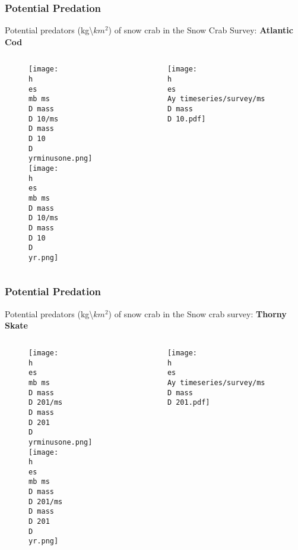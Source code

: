\documentclass{beamer}
\numberwithin{equation}{section}		%
\numberwithin{figure}{section}	   	%
\numberwithin{table}{section}				%
\newcommand{\yr}{2017}
\newcommand{\yrminusone}{2016}
\newcommand{\D}{.}  %
\newcommand{\h}{C:/} %
\newcommand{\es}{bio.data/bio.snowcrab/} %
\newcommand{\Ay}{assessments/2017/}
\newcommand{\mb}{output/maps/survey/snowcrab/annual/bycatch/} %
\begin{document}
\begin{frame}
\frametitle{Potential Predation}
Potential predators (kg\textbackslash$km^2$) of snow crab in the Snow Crab Survey: \textbf{Atlantic Cod}
	\begin{columns}

	\begin{column}{0.4\textwidth}
 	\begin{figure}
    \texttt{[image: \\h \\es \\mb ms\\D mass\\D 10/ms\\D mass\\D 10\\D \\yrminusone.png]}\\   
    \texttt{[image: \\h \\es \\mb ms\\D mass\\D 10/ms\\D mass\\D 10\\D \\yr.png]}\\   
    \end{figure}
  	\end{column}

	\begin{column}{0.6\textwidth}
 	\begin{figure}
  	\texttt{[image: \\h \\es \\Ay timeseries/survey/ms\\D mass\\D 10.pdf]}\\
   	\end{figure}
  	\end{column}

  	\end{columns}
\end{frame}


\begin{frame}
\frametitle{Potential Predation}
Potential predators (kg\textbackslash$km^2$) of snow crab in the Snow crab survey: \textbf{Thorny Skate}
\begin{columns}
	
	\begin{column}{0.4\textwidth}
		\begin{figure}
			\texttt{[image: \\h \\es \\mb ms\\D mass\\D 201/ms\\D mass\\D 201\\D \\yrminusone.png]}\\   
			\texttt{[image: \\h \\es \\mb ms\\D mass\\D 201/ms\\D mass\\D 201\\D \\yr.png]}\\   
		\end{figure}
	\end{column}
	
	\begin{column}{0.6\textwidth}
		\begin{figure}
			\texttt{[image: \\h \\es \\Ay timeseries/survey/ms\\D mass\\D 201.pdf]}\\
		\end{figure}
	\end{column}
	
\end{columns}
\end{frame}
\end{document}
